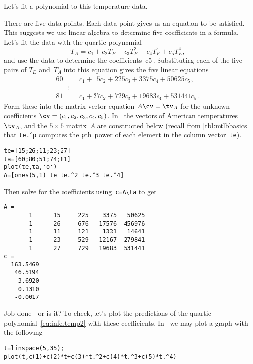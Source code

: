 \begin{example}
Let's fit a polynomial to this temperature data.
\begin{solution}
There are five data points.
Each data point gives us an equation to be satisfied.
This suggests we use linear algebra to determine five coefficients in a formula.
Let's fit the data with the quartic polynomial
\begin{equation}
T_A=c_1+c_2T_E+c_3T_E^2+c_4T_E^3+c_5T_E^4,
\label{eq:infertemp2}
\end{equation}
and use the data to determine the coefficients~\hlist c5\,.
Substituting each of the five pairs of \(T_E\) and~\(T_A\) into this equation gives the five linear equations
\begin{eqnarray*}
60&=&c_1+15c_2+225c_3+3375c_4+50625c_5\,, \\
&\vdots&\\
81&=&c_1+27c_2+729c_3+19683c_4+531441c_5\,.
\end{eqnarray*}
Form these into the matrix-vector equation \(A\cv=\tv_A\) for the unknown coefficients \(\cv=(c_1,c_2,c_3,c_4,c_5)\).
In \script\ the vectors of American temperatures~\(\tv_A\), and the \(5\times5\) matrix~\(A\) are constructed below (recall from \cref{tbl:mtlbbasics} that \verb|te.^p| computes the \verb|p|th~power of each element in the column vector~\verb|te|).
\setbox\ajrqrbox\hbox{}%
\marginajrbox%
\begin{verbatim}
te=[15;26;11;23;27]
ta=[60;80;51;74;81]
plot(te,ta,'o')
A=[ones(5,1) te te.^2 te.^3 te.^4]
\end{verbatim}
Then solve for the coefficients using~\verb|c=A\ta| to get
\begin{verbatim}
A =
       1      15     225    3375   50625
       1      26     676   17576  456976
       1      11     121    1331   14641
       1      23     529   12167  279841
       1      27     729   19683  531441
c =
 -163.5469
   46.5194
   -3.6920
    0.1310
   -0.0017
\end{verbatim}
Job done---or is it?
To check, let's plot the predictions of the quartic polynomial~\eqref{eq:infertemp2} with these coefficients.
In \script\ we may plot a graph with the following
\setbox\ajrqrbox\hbox{}%
\marginajrbox%
\begin{verbatim}
t=linspace(5,35);
plot(t,c(1)+c(2)*t+c(3)*t.^2+c(4)*t.^3+c(5)*t.^4)

\end{verbatim}
\end{solution}
\end{example}
